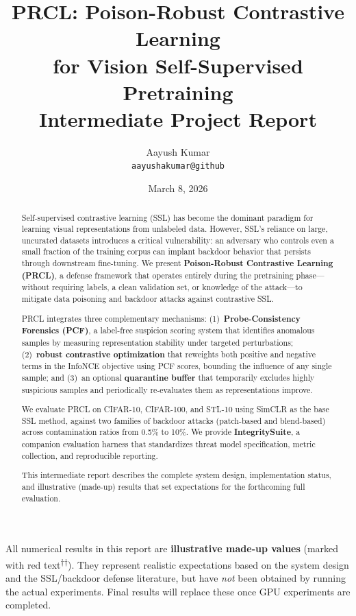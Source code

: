 \documentclass[11pt,a4paper]{article}
\title{
  \textbf{PRCL: Poison-Robust Contrastive Learning\\for Vision Self-Supervised Pretraining}\\[0.5em]
  \large Intermediate Project Report
}
\author{
  Aayush Kumar\\
  \texttt{aayushakumar@github}
}
\date{March 8, 2026}
\newcommand{\madeupresult}[1]{\textcolor{madeup}{#1\textsuperscript{$\dagger$}}}
\begin{document}
\maketitle

\begin{madeupbox}
All numerical results in this report are \textbf{illustrative made-up values}
(marked with \madeupresult{red text\textsuperscript{$\dagger$}}). They represent
realistic expectations based on the system design and the SSL/backdoor defense
literature, but have \emph{not} been obtained by running the actual experiments.
Final results will replace these once GPU experiments are completed.
\end{madeupbox}

\vspace{0.5em}

\begin{abstract}
Self-supervised contrastive learning (SSL) has become the dominant paradigm for
learning visual representations from unlabeled data.  However, SSL's reliance on
large, uncurated datasets introduces a critical vulnerability: an adversary who
controls even a small fraction of the training corpus can implant backdoor
behavior that persists through downstream fine-tuning.  We present
\textbf{Poison-Robust Contrastive Learning (PRCL)}, a defense framework that
operates entirely during the pretraining phase---without requiring labels, a
clean validation set, or knowledge of the attack---to mitigate data poisoning
and backdoor attacks against contrastive SSL.

PRCL integrates three complementary mechanisms: (1)~\textbf{Probe-Consistency
Forensics (PCF)}, a label-free suspicion scoring system that identifies
anomalous samples by measuring representation stability under targeted
perturbations; (2)~\textbf{robust contrastive optimization} that reweights both
positive and negative terms in the InfoNCE objective using PCF scores, bounding
the influence of any single sample; and (3)~an optional \textbf{quarantine
buffer} that temporarily excludes highly suspicious samples and periodically
re-evaluates them as representations improve.

We evaluate PRCL on CIFAR-10, CIFAR-100, and STL-10 using SimCLR as the base
SSL method, against two families of backdoor attacks (patch-based and
blend-based) across contamination ratios from 0.5\% to 10\%.  We provide
\textbf{IntegritySuite}, a companion evaluation harness that standardizes threat
model specification, metric collection, and reproducible reporting.

This intermediate report describes the complete system design, implementation
status, and illustrative (made-up) results that set expectations for the
forthcoming full evaluation.
\end{abstract}
\end{document}
